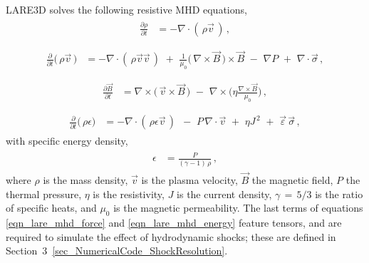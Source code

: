 \documentclass{./packages/rs/rsproca}
\begin{document}
LARE3D solves the following resistive MHD equations,
\begin{align}\begin{split}
\label{eqn_lare_mhd_mass}
\frac{\partial\rho}{\partial t} &= -\nabla\cdot(\,\rho\vec{v}\,)\,,\\
\end{split}\end{align}
\begin{align}\begin{split}
\label{eqn_lare_mhd_force}
\frac{\partial}{\partial t}\big(\,\rho\vec{v}\,\big) &= -\nabla\cdot(\,\rho\vec{v}\vec{v}\,)\,\,+\,\,\frac{1}{\mu_0}\Big(\,\nabla\times\vec{B}\,\Big)\times\vec{B}\,\,-\,\,\nabla{P}\,\,+\,\,\nabla\cdot{\vec{\sigma}}\,,\\
\end{split}\end{align}
\begin{align}\begin{split}
\label{eqn_lare_mhd_induction}
\frac{\partial\vec{B}}{\partial t} &= \nabla\times\Big(\,\vec{v}\times\vec{B}\,\Big)\,\,-\,\,\nabla\times\Bigg(\eta\frac{\nabla\times\vec{B}}{\mu_0}\Bigg)\,,\\
\end{split}\end{align}
\begin{align}\begin{split}
\label{eqn_lare_mhd_energy}
\frac{\partial}{\partial t}\big(\,\rho\epsilon\big) &= -\nabla\cdot(\,\rho\epsilon\vec{v}\,)\,\,\,-\,\,P\,\nabla\cdot\vec{v}\,\,+\,\,\eta J^{\,2}\,\,+\,\,\vec{\varepsilon}\,\vec{\sigma}\,,
\end{split}\end{align}
with specific energy density,
\begin{align}\begin{split}
\label{eqn_lare_mhd_epsilon}
\epsilon &= \frac{P}{(\gamma-1)\,\rho}\,,
\end{split}\end{align}
where $\rho$ is the mass density, $\vec{v}$ is the plasma velocity, $\vec{B}$ the magnetic field, $P$ the thermal pressure, $\eta$ is the resistivity, $J$ is the current density, $\gamma\,{=}\,5/3$ is the ratio of specific heats, and $\mu_0$ is the magnetic permeability. The last terms of equations \ref{eqn_lare_mhd_force} and \ref{eqn_lare_mhd_energy} feature tensors, and are required to simulate the effect of hydrodynamic shocks; these are defined in \mbox{Section 3 \ref{sec_NumericalCode_ShockResolution}}.
\end{document}
